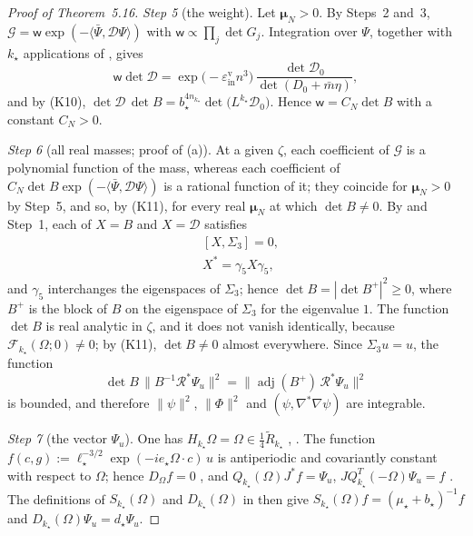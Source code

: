 \documentclass[11pt]{amsart}
\theoremstyle{definition}
\begin{document}
\begin{proof}[Proof of Theorem~5.16]
\emph{Step 5} (the weight).
Let $\boldsymbol\mu_N>0$.
By Steps~2 and~3, $\mathcal G=\mathsf w\exp(-\langle\bar\Psi,\mathcal D\Psi\rangle)$ with $\mathsf w\propto\prod_j\det G_j$.
Integration over $\Psi$, together with $k_\star$ applications of \cite[Proposition~22.2\,(a)]{QEDIII}, gives
\begin{equation*}
\mathsf w\det\mathcal D=\exp\bigl(-\varepsilon^{\mathrm v}_{\mathrm{in}}n^3\bigr)\,\frac{\det\mathcal D_0}{\det(D_0+\bar m\eta)},
\end{equation*}
and by (K10), $\det\mathcal D\,\allowbreak \det B=\allowbreak b_\star^{4n_{k_\star}}\det\bigl(L^{k_\star}\mathcal D_0\bigr)$.
Hence $\mathsf w=C_N\det B$ with a constant $C_N>0$.

\emph{Step 6} (all real masses; proof of (a)).
At a given $\zeta$, each coefficient of $\mathcal G$ is a polynomial function of the mass, whereas each coefficient of $C_N\det B\exp(-\langle\bar\Psi,\mathcal D\Psi\rangle)$ is a rational function of it;
they coincide for $\boldsymbol\mu_N>0$ by Step~5, and so, by (K11), for every real $\boldsymbol\mu_N$ at which $\det B\ne0$.
By \cite[(I.O2), (I.O3)]{QEDIII} and Step~1, each of $X=B$ and $X=\mathcal D$ satisfies
\begin{align}
&[X,\Sigma_3]=0,\tag{P1}\\
&X^*=\gamma_5X\gamma_5,\tag{P2}
\end{align}
and $\gamma_5$ interchanges the eigenspaces of $\Sigma_3$;
hence $\det B=|\det B^+|^2\ge0$, where $B^+$ is the block of $B$ on the eigenspace of $\Sigma_3$ for the eigenvalue $1$.
The function $\det B$ is real analytic in $\zeta$, and it does not vanish identically, because $\mathscr F_{k_\star}(\Omega;0)\ne0$;
by (K11), $\det B\ne0$ almost everywhere.
Since $\Sigma_3u=u$, the function
\begin{equation*}
\det B\,\|B^{-1}\mathcal R^*\Psi_u\|^2=\|\operatorname{adj}(B^+)\,\mathcal R^*\Psi_u\|^2
\end{equation*}
is bounded, and therefore $\|\psi\|^2$, $\|\Phi\|^2$ and $(\psi,\nabla^*\nabla\psi)$ are integrable.

\emph{Step 7} (the vector $\Psi_u$).
One has $H_{k_\star}\Omega=\Omega\in\frac14\tilde R_{k_\star}$ \cite[Proposition~5.31]{QEDI}, \cite{QEDIII}.
The function $f(c,g):=\ell_\star^{-3/2}\exp(-ie_\star\Omega\cdot c)\,u$ is antiperiodic and covariantly constant with respect to $\Omega$;
hence $D_\Omega f=0$ \cite[(I.O8)]{QEDIII}, and $Q_{k_\star}(\Omega)J^*f=\Psi_u$, $JQ^T_{k_\star}(-\Omega)\Psi_u=f$ \cite{QEDIII}.
The definitions of $S_{k_\star}(\Omega)$ and $D_{k_\star}(\Omega)$ in \cite{QEDIII} then give $S_{k_\star}(\Omega)f=(\mu_\star+b_\star)^{-1}f$ and $D_{k_\star}(\Omega)\Psi_u=d_\star\Psi_u$.


\end{proof}
\end{document}
